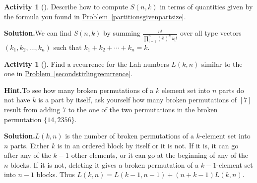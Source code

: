 \documentclass[10pt,]{book}
\theoremstyle{plain}
\theoremstyle{definition}
\newtheorem{activity}[project]{Activity}
\numberwithin{equation}{chapter}
\begin{document}
\begin{activity}[]\label{activity-130}
Describe how to compute \(S(n,k)\) in terms of quantities given by the formula you found in \hyperref[partitionsgivenpartsize]{Problem~\ref{partitionsgivenpartsize}}.%
\par\medskip\noindent%
\textbf{Solution.}\quad We can find \(S(n,k)\) by summing \(\frac{n!}{\prod_{i=1}^n (i!)^{k_i}{k_i!}}\) over all type vectors \((k_1,k_2,\ldots,k_n)\) such that \(k_1+k_2+\cdots+k_n=k\).%
\end{activity}
\begin{activity}[]\label{activity-131}
Find a recurrence for the Lah numbers \(L(k,n)\) similar to the one in \hyperref[secondstirlingrecurrence]{Problem~\ref{secondstirlingrecurrence}}.%
\par\medskip\noindent%
\textbf{Hint.}\quad To see how many broken permutations of a \(k\) element set into \(n\) parts do not have \(k\) is a part by itself, ask yourself how many broken permutations of \([7]\) result from adding 7 to the one of the two permutations in the broken permutation \(\{14, 2356\}\).%
\par\medskip\noindent%
\textbf{Solution.}\quad \(L(k,n)\) is the number of broken permutations of a \(k\)-element set into \(n\) parts. Either \(k\) is in an ordered block by itself or it is not. If it is, it can go after any of the \(k-1\) other elements, or it can go at the beginning of any of the \(n\) blocks. If it is not, deleting it gives a broken permutation of a \(k-1\)-element set into \(n-1\) blocks. Thus \(L(k,n)=L(k-1,n-1) + (n+k-1)L(k,n)\).%
\end{activity}
\end{document}
